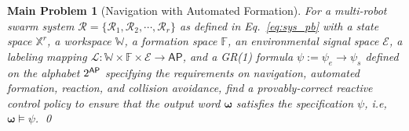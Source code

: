 \documentclass[letterpaper, 10 pt, conference]{ieeeconf}
\newtheorem{problem}{Main Problem}
\begin{document}

\begin{problem}[Navigation with Automated Formation]
\label{pb:overall}
For a multi-robot swarm system $\mathcal{R} = \{\mathcal{R}_1, \mathcal{R}_2, \cdots, \mathcal{R}_r\}$ as defined in Eq.~\eqref{eq:sys_pb} with a state space $\mathbb{X}^r$, a workspace $\mathbb{W}$, a formation space $\mathbb{F}$, an environmental signal space $\mathcal{E}$, a labeling mapping $\mathcal{L}:\mathbb{W}\times\mathbb{F}\times\mathcal{E} \rightarrow \mathsf{AP}$, and a GR(1) formula $\psi:= \psi_e \rightarrow \psi_s$ defined on the alphabet $2^{\mathsf{AP}}$ specifying the requirements on navigation, automated formation, reaction, and collision avoidance, find a provably-correct reactive control policy to ensure that the output word $\pmb{\omega}$ satisfies the specification $\psi$, i.e, $\pmb{\omega} \vDash \psi$. \qed
\end{problem}





\end{document}
